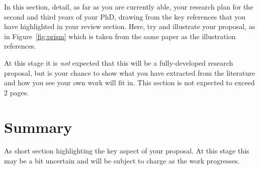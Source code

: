 \documentclass[a4paper,12pt]{article}
\begin{document}
In this section, detail, as far as you are currently able, 
your research plan for the second and third years of your PhD, 
drawing from the key references \cite{jr:block} that you have highlighted in your review section. 
Here, try and illustrate
your proposal, as in Figure~\ref{fig:prism} which is taken from the
same paper as the illustration references.
%
%

At this stage it is {\em not} expected that this will be a fully-developed
research proposal, but is your chance to show what you have extracted from the
literature and how you see your own work will fit in. This section is
not expected to exceed 2 pages.
 
\section{Summary}

As short section highlighting the key aspect of your proposal.
At this stage this may be a bit uncertain and will be subject
to charge as the work progresses.




\end{document}
